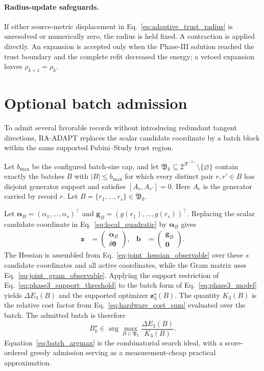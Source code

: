 \documentclass[
  reprint,
  amsmath,
  amssymb,
  aps,
  pra,
  nofootinbib,
  superscriptaddress,
  floatfix
]{revtex4-2}
\begin{document}
\paragraph*{Radius-update safeguards.}
If either source-metric displacement in
Eq.~\eqref{eq:adaptive_trust_radius} is unresolved or numerically zero, the
radius is held fixed. A contraction is applied directly. An expansion is
accepted only when the Phase-III solution reached the trust
boundary and the complete refit decreased the energy; a vetoed expansion
leaves \(\rho_{k+1}=\rho_k\).

\section{Optional batch admission}
\label{app:batching}

To admit several favorable records without introducing redundant tangent
directions, \textsc{RA-ADAPT} replaces the scalar candidate coordinate by a
batch block within the same supported Fubini--Study trust region.

Let \(b_{\max}\) be the configured batch-size cap, and let
\(\mathfrak B_k\subseteq
2^{\mathcal R^{(3)}}\setminus\{\varnothing\}\) contain exactly the
batches \(B\) with \(|B|\le b_{\max}\) for which every distinct pair
\(r,r'\in B\) has disjoint generator support and satisfies
\([A_r,A_{r'}]=0\). Here \(A_r\) is the generator carried by record \(r\).
Let
\(B=\{r_1,\ldots,r_s\}\in\mathfrak B_k\).

Let
\(\boldsymbol\alpha_B=(\alpha_1,\ldots,\alpha_s)^{\top}\) and
\(\mathbf g_B=(g(r_1),\ldots,g(r_s))^{\top}\). Replacing the scalar candidate
coordinate in Eq.~\eqref{eq:local_quadratic} by \(\boldsymbol\alpha_B\) gives
\begin{equation*}
\begin{aligned}
\mathbf z&=
\begin{pmatrix}
\boldsymbol\alpha_B\\
\delta\boldsymbol\theta
\end{pmatrix},
&
\mathbf b&=
\begin{pmatrix}
\mathbf g_B\\
\mathbf 0
\end{pmatrix}.
\end{aligned}
\end{equation*}
The Hessian is assembled from Eq.~\eqref{eq:joint_hessian_observable} over these
\(s\) candidate coordinates and all active coordinates, while the Gram matrix
uses Eq.~\eqref{eq:joint_gram_observable}. Applying the support restriction of
Eq.~\eqref{eq:phase3_support_threshold} to the batch form of
Eq.~\eqref{eq:phase3_model} yields \(\Delta E_3(B)\) and the supported
optimizer \(\mathbf z_3^\star(B)\).
The quantity \(K_3(B)\) is the relative cost factor from
Eq.~\eqref{eq:hardware_cost_sum} evaluated over the batch. The admitted batch
is therefore
\begin{equation}
B_k^\star\in\arg\max_{B\in\mathfrak B_k}
\frac{\Delta E_3(B)}{K_3(B)}.
\label{eq:batch_argmax}
\end{equation}
Equation~\eqref{eq:batch_argmax} is the combinatorial search ideal, with a
score-ordered greedy admission serving as a measurement-cheap practical
approximation.
\end{document}

